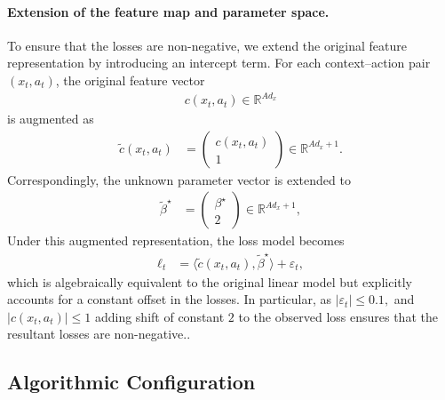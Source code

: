 \documentclass[11pt,letterpaper]{article}
\newcommand{\loss}{\ell}
\theoremstyle{plain}
\theoremstyle{definition}  %
\begin{document}
\paragraph{Extension of the feature map and parameter space.}
To ensure that the losses are non-negative,  we extend the original feature representation by introducing an intercept term. For each context–action pair $(x_t, a_t)$, the original feature vector
\begin{align*}
c(x_t, a_t) \in \mathbb{R}^{A d_x}
\end{align*}
is augmented as
\begin{align*}
\tilde{c}(x_t, a_t)
&=
\begin{pmatrix}
c(x_t, a_t) \\
1
\end{pmatrix}
\in
\mathbb{R}^{A d_x + 1}.
\end{align*}
\noindent Correspondingly, the unknown parameter vector is extended to
\begin{align*}
\tilde{\beta}^\star
&=
\begin{pmatrix}
\beta^\star \\
2
\end{pmatrix}
\in
\mathbb{R}^{A d_x + 1},
\end{align*}
Under this augmented representation, the loss model becomes
\begin{align*}
\loss_t
&=
\langle \tilde{c}(x_t, a_t), \tilde{\beta}^\star \rangle + \varepsilon_t,
\end{align*}
which is algebraically equivalent to the original linear model but explicitly accounts for a constant offset in the losses. In particular, as $|\varepsilon_t| \leq 0.1,$ and $|c(x_t,a_t)| \leq 1$ adding shift of constant $2$ to the observed loss ensures that the resultant losses are non-negative..




 
\subsection*{Algorithmic Configuration}
\end{document}
